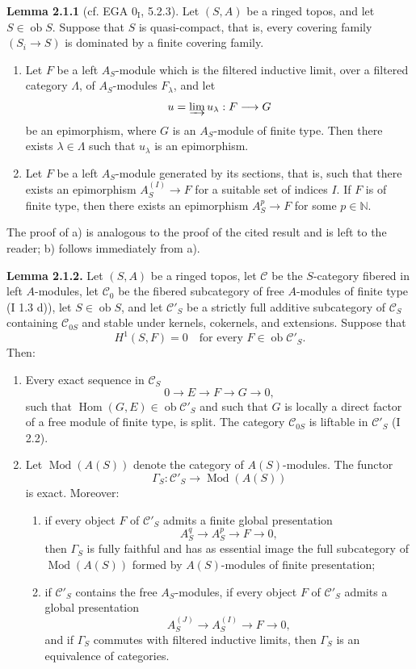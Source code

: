 \documentclass[11pt]{article}
\providecommand{\Mod}{\operatorname{Mod}}
\providecommand{\Ob}{\operatorname{ob}}
\begin{document}
\textbf{Lemma 2.1.1} (cf. EGA $0_{\mathrm I}$, 5.2.3). Let $(S,A)$ be a ringed topos, and let $S\in\Ob S$. Suppose that $S$ is quasi-compact, that is, every covering family $(S_i\to S)$ is dominated by a finite covering family.
\begin{enumerate}[label=\alph*)]
\item Let $F$ be a left $A_S$-module which is the filtered inductive limit, over a filtered category $\Lambda$, of $A_S$-modules $F_\lambda$, and let
\[
u=\varinjlim u_\lambda:F\longrightarrow G
\]
be an epimorphism, where $G$ is an $A_S$-module of finite type. Then there exists $\lambda\in\Lambda$ such that $u_\lambda$ is an epimorphism.
\item Let $F$ be a left $A_S$-module generated by its sections, that is, such that there exists an epimorphism $A_S^{(I)}\to F$ for a suitable set of indices $I$. If $F$ is of finite type, then there exists an epimorphism $A_S^p\to F$ for some $p\in\mathbb N$.
\end{enumerate}
The proof of a) is analogous to the proof of the cited result and is left to the reader; b) follows immediately from a).

\textbf{Lemma 2.1.2.} Let $(S,A)$ be a ringed topos, let $\mathcal C$ be the $S$-category fibered in left $A$-modules, let $\mathcal C_0$ be the fibered subcategory of free $A$-modules of finite type (I 1.3 d)), let $S\in\Ob S$, and let $\mathcal C'_S$ be a strictly full additive subcategory of $\mathcal C_S$ containing $\mathcal C_{0S}$ and stable under kernels, cokernels, and extensions. Suppose that
\[
H^1(S,F)=0\quad\text{for every }F\in\Ob\mathcal C'_S.
\]
Then:
\begin{enumerate}[label=\alph*)]
\item Every exact sequence in $\mathcal C_S$
\[
0\longrightarrow E\longrightarrow F\longrightarrow G\longrightarrow0,
\]
such that $\operatorname{Hom}(G,E)\in\Ob\mathcal C'_S$ and such that $G$ is locally a direct factor of a free module of finite type, is split. The category $\mathcal C_{0S}$ is liftable in $\mathcal C'_S$ (I 2.2).
\item Let $\Mod(A(S))$ denote the category of $A(S)$-modules. The functor
\[
\Gamma_S:\mathcal C'_S\longrightarrow\Mod(A(S))
\]
is exact. Moreover:
\begin{enumerate}[label=(\roman*)]
\item if every object $F$ of $\mathcal C'_S$ admits a finite global presentation
\[
A_S^q\longrightarrow A_S^p\longrightarrow F\longrightarrow0,
\]
then $\Gamma_S$ is fully faithful and has as essential image the full subcategory of $\Mod(A(S))$ formed by $A(S)$-modules of finite presentation;
\item if $\mathcal C'_S$ contains the free $A_S$-modules, if every object $F$ of $\mathcal C'_S$ admits a global presentation
\[
A_S^{(J)}\longrightarrow A_S^{(I)}\longrightarrow F\longrightarrow0,
\]
and if $\Gamma_S$ commutes with filtered inductive limits, then $\Gamma_S$ is an equivalence of categories.
\end{enumerate}
\end{enumerate}
\end{document}
